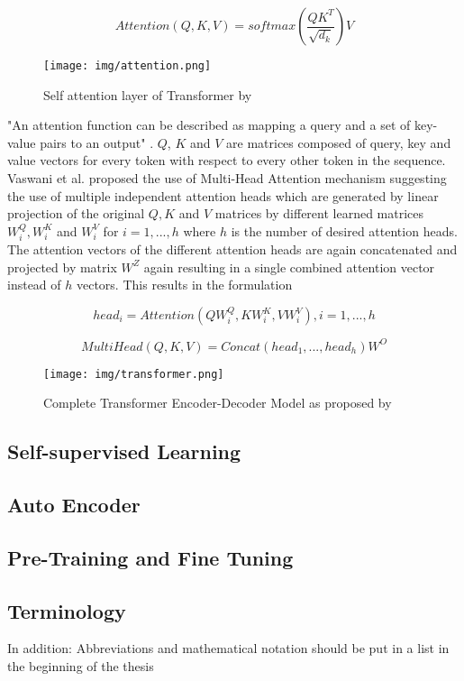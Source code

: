 \begin{equation}
	Attention(Q,K,V) = softmax(\frac{QK^T}{\sqrt{d_k}})V
\end{equation}

\begin{figure}[h]
	\centering
	\texttt{[image: img/attention.png]}
	\caption{Self attention layer of Transformer by \cite{attention_origin}}
	\label{fig:attention}
\end{figure}

"An attention function can be described as mapping a query and a set of key-value pairs to an output" \cite{attention_origin}. $Q$, $K$ and $V$ are matrices composed of query, key and value vectors for every token with respect to every other token in the sequence.
Vaswani et al. proposed the use of Multi-Head Attention mechanism suggesting the use of multiple independent attention heads which are generated by linear projection of the original $Q, K$ and $V$ matrices by different learned matrices $W^Q_i, W^K_i$ and $W^V_i$ for $i = 1, ... ,h$ where $h$ is the number of desired attention heads. The attention vectors of the different attention heads are again concatenated and projected by matrix $W^Z$ again resulting in a single combined attention vector instead of $h$ vectors. This results in the formulation 

\begin{equation}
	head_i = Attention(QW^Q_i, KW^K_i, VW^V_i), i = 1, ..., h
\end{equation}

\begin{equation}
	MultiHead(Q,K,V) = Concat(head_1, ..., head_h)W^O
\end{equation}


\begin{figure}[h]
	\centering
	\texttt{[image: img/transformer.png]}
	\caption{Complete Transformer Encoder-Decoder Model as proposed by \cite{attention_origin}}
	\label{fig:transformer}
\end{figure}

\subsection{Self-supervised Learning}

\subsection{Auto Encoder}

\subsection{Pre-Training and Fine Tuning}

\subsection{Terminology} \label{subsec.terminology}

In addition: Abbreviations and mathematical notation should be put in a list in the beginning of the thesis 

\newpage